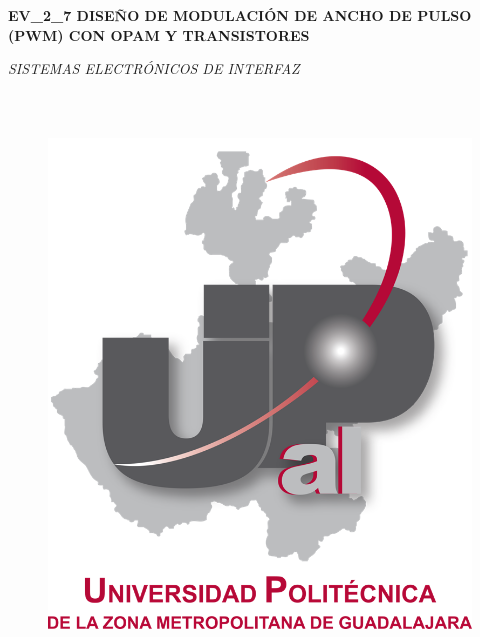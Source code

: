 \documentclass[12pt]{article}
\begin{document}
\begin{Center}
{\fontsize{14pt}{16.8pt}\selectfont \textbf{EV\_2\_7 DISEÑO DE MODULACIÓN DE ANCHO DE PULSO (PWM) CON OPAM Y TRANSISTORES}\par}
\end{Center}\par

\begin{Center}
\textit{SISTEMAS ELECTRÓNICOS DE INTERFAZ}
\end{Center}\par


\vspace{\baselineskip}



\begin{figure}[H]
	\begin{Center}
		\includegraphics[width=5.24in,height=6.06in]{./media/image1.png}
	\end{Center}
\end{figure}


\end{document}
